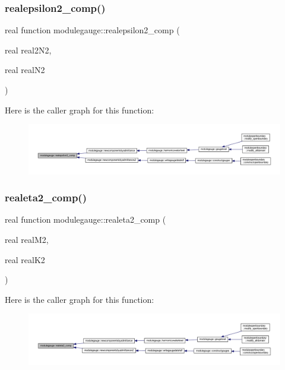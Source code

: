 \subsubsection{\texorpdfstring{realepsilon2\+\_\+comp()}{realepsilon2\_comp()}}
{\footnotesize\ttfamily real function modulegauge\+::realepsilon2\+\_\+comp (\begin{DoxyParamCaption}\item[{real}]{real2\+N2,  }\item[{real}]{real\+N2 }\end{DoxyParamCaption})\hspace{0.3cm}{\ttfamily [private]}}

Here is the caller graph for this function\+:\nopagebreak
\begin{figure}[H]
\begin{center}
\leavevmode
\includegraphics[width=350pt]{namespacemodulegauge_a21ce68783e04b0fd7b9b57cc33bb1117_icgraph}
\end{center}
\end{figure}
\mbox{\label{namespacemodulegauge_a56eb9e88f9dfa7360cdf57474d0371d0}} 
\subsubsection{\texorpdfstring{realeta2\+\_\+comp()}{realeta2\_comp()}}
{\footnotesize\ttfamily real function modulegauge\+::realeta2\+\_\+comp (\begin{DoxyParamCaption}\item[{real}]{real\+M2,  }\item[{real}]{real\+K2 }\end{DoxyParamCaption})\hspace{0.3cm}{\ttfamily [private]}}

Here is the caller graph for this function\+:\nopagebreak
\begin{figure}[H]
\begin{center}
\leavevmode
\includegraphics[width=350pt]{namespacemodulegauge_a56eb9e88f9dfa7360cdf57474d0371d0_icgraph}
\end{center}
\end{figure}
\mbox{\label{namespacemodulegauge_a48b5405cff2ce5a1d7821cc09cd69260}} 
